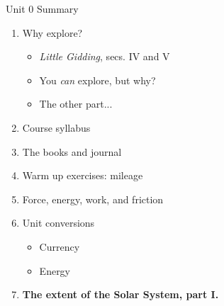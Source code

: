 \documentclass{beamer}
\begin{document}
\begin{frame}{Unit 0 Summary}
\begin{enumerate}
\item Why explore?
\begin{itemize}
\item \textit{Little Gidding}, secs. IV and V
\item You \textit{can} explore, but why?
\item The other part...
\end{itemize}
\item Course syllabus
\item The books and journal
\item Warm up exercises: mileage
\item Force, energy, work, and friction
\item Unit conversions
\begin{itemize}
\item Currency
\item Energy
\end{itemize}
\item \textbf{The extent of the Solar System, part I.}
\end{enumerate}
\end{frame}
\end{document}
